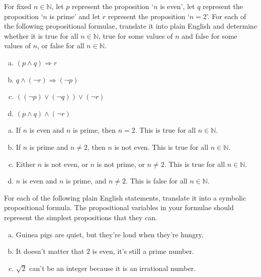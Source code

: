 \begin{chapex}
\label{cqTranslatePropositionalFormulaeToEnglish}
For fixed $n \in \mathbb{N}$, let $p$ represent the proposition `$n$ is even', let $q$ represent the proposition `$n$ is prime' and let $r$ represent the proposition `$n = 2$'. For each of the following propositional formulae, translate it into plain English and determine whether it is true for all $n \in \mathbb{N}$, true for some values of $n$ and false for some values of $n$, or false for all $n \in \mathbb{N}$.

\begin{enumerate}[(a)]
\item $(p \wedge q) \Rightarrow r$
\item $q \wedge (\neg r) \Rightarrow (\neg p)$
\item $((\neg p) \vee (\neg q)) \vee (\neg r)$
\item $(p \wedge q) \wedge (\neg r)$
\end{enumerate}
\end{chapex}

\begin{mysolution}
    \begin{enumerate}[(a)]
    \item If $n$ is even and $n$ is prime, then $n = 2$. This is true for all $n \in \mathbb{N}$.
    \item If $n$ is prime and $n \ne 2$, then $n$ is not even. This is true for all $n \in \mathbb{N}$.
    \item Either $n$ is not even, or $n$ is not prime, or $n \ne 2$. This is true for all $n \in \mathbb{N}$.
    \item $n$ is even and $n$ is prime, and $n \ne 2$. This is false for all $n \in \mathbb{N}$.
    \end{enumerate}
\end{mysolution}

\begin{chapex}
For each of the following plain English statements, translate it into a symbolic propositional formula. The propositional variables in your formulae should represent the simplest propositions that they can.
\begin{enumerate}[(a)]
\item Guinea pigs are quiet, but they're loud when they're hungry.
\item It doesn't matter that $2$ is even, it's still a prime number.
\item $\sqrt{2}$ can't be an integer because it is an irrational number.
\end{enumerate}
\end{chapex}


